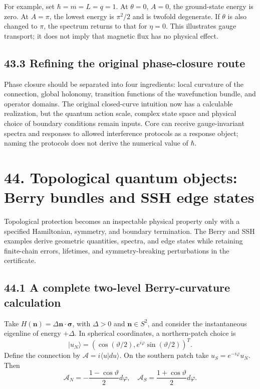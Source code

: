 \documentclass[
  11pt,
  oneside]{book}
\begin{document}
For example, set \(\hbar=m=L=q=1\). At \(\theta=0\), \(A=0\), the
ground-state energy is zero. At \(A=\pi\), the lowest energy is
\(\pi^2/2\) and is twofold degenerate. If \(\theta\) is also changed to
\(\pi\), the spectrum returns to that for \(\eta=0\). This illustrates
gauge transport; it does not imply that magnetic flux has no physical
effect.

\section{43.3 Refining the original phase-closure route}

Phase closure should be separated into four ingredients: local curvature
of the connection, global holonomy, transition functions of the
wavefunction bundle, and operator domains. The original closed-curve
intuition now has a calculable realization, but the quantum action
scale, complex state space and physical choice of boundary conditions
remain inputs. Core can receive gauge-invariant spectra and responses to
allowed interference protocols as a response object; naming the
protocols does not derive the numerical value of \(\hbar\).

\chapter{44. Topological quantum objects: Berry bundles and SSH edge
states}\label{ch-44}

Topological protection becomes an inspectable physical property only
with a specified Hamiltonian, symmetry, and boundary termination. The
Berry and SSH examples derive geometric quantities, spectra, and edge
states while retaining finite-chain errors, lifetimes, and
symmetry-breaking perturbations in the certificate.

\section{44.1 A complete two-level Berry-curvature calculation}

Take \(H(\mathbf n)=\Delta\mathbf n\cdot\boldsymbol\sigma\), with
\(\Delta>0\) and \(\mathbf n\in S^2\), and consider the instantaneous
eigenline of energy \(+\Delta\). In spherical coordinates, a
northern-patch choice is \[
|u_N\rangle=(\cos(\vartheta/2),e^{i\varphi}\sin(\vartheta/2))^T.
\] Define the connection by \(\mathcal A=i\langle u|du\rangle\). On the
southern patch take \(u_S=e^{-i\varphi}u_N\). Then \[
\mathcal A_N=-\frac{1-\cos\vartheta}{2}d\varphi,
\quad \mathcal A_S=\frac{1+\cos\vartheta}{2}d\varphi.
\]
\end{document}
